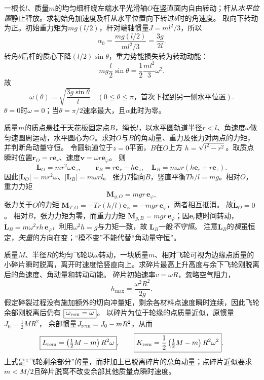 \problemtext 一根长$l$、质量$m$的均匀细杆绕左端水平光滑轴$O$在竖直面内自由转动；杆从\emph{水平位置}静止释放。求初始角加速度及杆从水平位置向下转过$\theta$时的角速度。
\workings
取向下转动为正。初始重力矩为$mg(l/2)$，杆对端轴惯量$J=ml^2/3$，所以
\[
\boxed{\alpha_0=\frac{mg(l/2)}{ml^2/3}=\frac{3g}{2l}}.
\]
转角$\theta$后杆的质心下降$(l/2)\sin\theta$，重力势能损失转为转动动能：
\[
mg\frac l2\sin\theta=\frac12\frac{ml^2}{3}\omega^2.
\]
故
\[
\boxed{\omega(\theta)=\sqrt{\frac{3g\sin\theta}{l}}}
\quad(0\le\theta\le\pi\text{，首次下摆到另一侧水平位置}).
\]
\crosscheck $\theta=0$时$\omega=0$；当$\theta=\pi/2$速率最大，且$\alpha$此时为零。

\problemtext 质量$m$的质点悬挂于天花板固定点$B$，绳长$l$，以水平圆轨道半径$r<l$、角速度$\omega$做匀速圆周运动，水平圆心为$O$。求对$O$与$B$的角动量、重力及张力对两点的力矩，并判断角动量守恒。
\workings
令圆轨道位于$z=0$平面，$B$在$O$上方
$h=\sqrt{l^2-r^2}$。取质点瞬时位置$\bm r_O=r\bm e_r$、速度$\bm v=\omega r\bm e_\varphi$。
则
\[
\boxed{\bm L_O=mr^2\omega\bm e_z},\qquad
\bm r_B=r\bm e_r-h\bm e_z,
\quad
\boxed{\bm L_B=m\omega r(h\bm e_r+r\bm e_z)}.
\]
因此$|\bm L_O|=mr^2\omega$、$|\bm L_B|=m\omega rl$。
张力$T$指向$B$，竖直平衡$Th/l=mg$。相对$O$，重力力矩
\[
\bm M_{g,O}=mgr\,\bm e_\varphi,
\]
张力关于$O$的力矩
$\bm M_{T,O}=-Tr(h/l)\bm e_\varphi=-mgr\,\bm e_\varphi$，两者相互抵消。
故$\boxed{\dot{\bm L}_O=0}$。
相对$B$，张力力矩为零，而重力力矩
$\boxed{\bm M_{g,B}=mgr\,\bm e_\varphi}$；因$\bm e_r$随时间转动，
$\dot{\bm L}_B=m\omega^2rh\,\bm e_\varphi$，利用$\omega^2h=g$与力矩一致，故
$\bm L_B$一般\emph{不守恒}。
\crosscheck 注意$\bm L_B$的\emph{模}虽恒定，\emph{矢量}的方向在变；“模不变”不能代替“角动量守恒”。

\problemtext 质量$M$、半径$R$的均匀飞轮以$\omega$转动，一块质量$m$、相对飞轮可视为边缘点质量的小碎片瞬时脱离，离开时速度恰竖直向上。求碎片最高上升高度与余下飞轮刚脱离后的角速度、角动量和转动动能。
\workings
碎片初始速率$v=\omega R$，忽略空气阻力，
\[
\boxed{h_{\max}=\frac{\omega^2R^2}{2g}}.
\]
假定碎裂过程没有施加额外的切向冲量矩，剩余各材料点速度瞬时连续，因此飞轮余部刚脱离后仍有
$\boxed{\omega_{\rm rem}=\omega}$。
以碎片为位于轮缘的点质量近似，原惯量$J_0=\frac12MR^2$，
余部惯量$J_{\rm rem}=J_0-mR^2$，从而
\[
\boxed{L_{\rm rem}=\left(\tfrac12M-m\right)R^2\omega},
\qquad
\boxed{K_{\rm rem}=\frac12\left(\tfrac12M-m\right)R^2\omega^2}.
\]
\crosscheck 上式是“飞轮剩余部分”的量，而非加上已脱离碎片的总角动量；点碎片近似要求$m<M/2$且碎片脱离不改变余部其他质量点瞬时速度。

